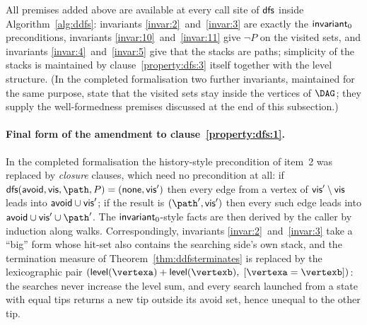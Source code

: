 All premises added above are available at every call site of $\textsf{\upshape dfs}$ inside
Algorithm~\ref{alg:ddfs}: invariants \ref{invar:2}~and~\ref{invar:3} are exactly the
$\textsf{\upshape invariant}_0$ preconditions, invariants \ref{invar:10}~and~\ref{invar:11} give
$\neg P$ on the visited sets, and invariants \ref{invar:4}~and~\ref{invar:5} give that
the stacks are paths; simplicity of the stacks is maintained by
clause~\ref{property:dfs:3} itself together with the level structure.
(In the completed formalisation two further invariants, maintained for the same
purpose, state that the visited sets stay inside the vertices of $\DAG$; they supply
the well-formedness premises discussed at the end of this subsection.)

\paragraph{Final form of the amendment to clause~\ref{property:dfs:1}.}
In the completed formalisation the history-style precondition of item~2 was replaced by
\emph{closure} clauses, which need no precondition at all: if
$\dfs(\avoid,\vis,\path,P) = (\none,\vis')$ then every edge from a vertex of
$\textsf{\upshape vis}'\setminus\textsf{\upshape vis}$ leads into $\textsf{\upshape avoid}\cup\textsf{\upshape vis}'$; if the result is
$(\path',\vis')$ then every such edge leads into $\avoid\cup\vis'\cup\path'$.
The $\textsf{\upshape invariant}_0$-style facts are then derived by the caller by induction along walks.
Correspondingly, invariants \ref{invar:2}~and~\ref{invar:3} take a ``big'' form whose
hit-set also contains the searching side's own stack, and the termination measure of
Theorem~\ref{thm:ddfsterminates} is replaced by the lexicographic pair
$(\level(\vertexa)+\level(\vertexb),\;[\vertexa=\vertexb])$: the searches never
increase the level sum, and every search launched from a state with equal tips returns a
new tip outside its avoid set, hence unequal to the other tip.

